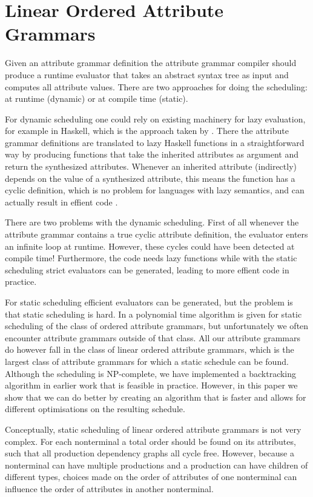 \documentclass{llncs}
\begin{document}
\section{Linear Ordered Attribute Grammars} \label{sect:loag}
Given an attribute grammar definition the attribute grammar compiler should produce a runtime evaluator that takes an abstract syntax tree as input and computes all attribute values. There are two approaches for doing the scheduling: at runtime (dynamic) or at compile time (static).

For dynamic scheduling one could rely on existing machinery for lazy evaluation, for example in Haskell, which is the approach taken by \cite{saraiva99}. There the attribute grammar definitions are translated to lazy Haskell functions in a straightforward way by producing functions that take the inherited attributes as argument and return the synthesized attributes. Whenever an inherited attribute (indirectly) depends on the value of a synthesized attribute, this means the function has a cyclic definition, which is no problem for languages with lazy semantics, and can actually result in effient code \cite{Bird:1984}.

There are two problems with the dynamic scheduling. First of all whenever the attribute grammar contains a true cyclic attribute definition, the evaluator enters an infinite loop at runtime. However, these cycles could have been detected at compile time! Furthermore, the code needs lazy functions while with the static scheduling strict evaluators can be generated, leading to more effient code in practice.

For static scheduling efficient evaluators can be generated, but the problem is that static scheduling is hard. In \cite{kastens80} a polynomial time algorithm is given for static scheduling of the class of ordered attribute grammars, but unfortunately we often encounter attribute grammars outside of that class. All our attribute grammars do however fall in the class of linear ordered attribute grammars, which is the largest class of attribute grammars for which a static schedule can be found. Although the scheduling is NP-complete, we have implemented a backtracking algorithm in earlier work \cite{Binsbergen:2015} that is feasible in practice. However, in this paper we show that we can do better by creating an algorithm that is faster and allows for different optimisations on the resulting schedule.

Conceptually, static scheduling of linear ordered attribute grammars is not very complex. For each nonterminal a total order should be found on its attributes, such that all production dependency graphs all cycle free. However, because a nonterminal can have multiple productions and a production can have children of different types, choices made on the order of attributes of one nonterminal can influence the order of attributes in another nonterminal.
\end{document}
